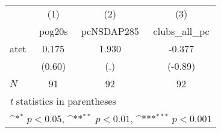 {
\def\sym#1{\ifmmode^{#1}\else\(^{#1}\)\fi}
\begin{tabular}{l*{3}{c}}
\hline\hline
            &\multicolumn{1}{c}{(1)}&\multicolumn{1}{c}{(2)}&\multicolumn{1}{c}{(3)}\\
            &\multicolumn{1}{c}{pog20s}&\multicolumn{1}{c}{pcNSDAP285}&\multicolumn{1}{c}{clubs\_all\_pc}\\
\hline
atet        &       0.175         &       1.930         &      -0.377         \\
            &      (0.60)         &         (.)         &     (-0.89)         \\
\hline
\(N\)       &          91         &          92         &          92         \\
\hline\hline
\multicolumn{4}{l}{\footnotesize \textit{t} statistics in parentheses}\\
\multicolumn{4}{l}{\footnotesize \sym{*} \(p<0.05\), \sym{**} \(p<0.01\), \sym{***} \(p<0.001\)}\\
\end{tabular}
}
